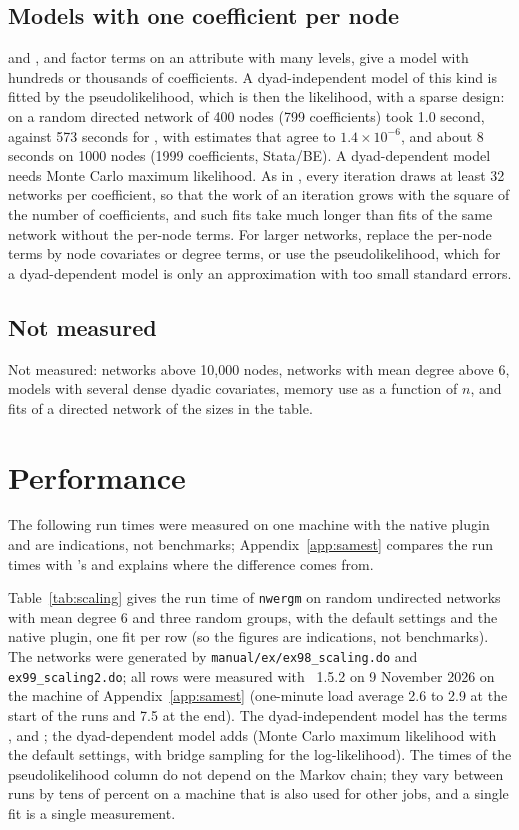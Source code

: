 \subsection{Models with one coefficient per node}\label{sec:pernode}

 and , and factor terms on an attribute with many levels, give a model with hundreds or thousands of coefficients. A dyad-independent model of this kind is fitted by the pseudolikelihood, which is then the likelihood, with a sparse design:  on a random directed network of 400 nodes (799 coefficients) took 1.0 second, against 573 seconds for \ergm{}, with estimates that agree to $1.4\times10^{-6}$, and about 8 seconds on 1000 nodes (1999 coefficients, Stata/BE). A dyad-dependent model needs Monte Carlo maximum likelihood. As in \ergm{}, every iteration draws at least 32 networks per coefficient, so that the work of an iteration grows with the square of the number of coefficients, and such fits take much longer than fits of the same network without the per-node terms. For larger networks, replace the per-node terms by node covariates or degree terms, or use the pseudolikelihood, which for a dyad-dependent model is only an approximation with too small standard errors.

\subsection{Not measured}

Not measured: networks above 10,000 nodes, networks with mean degree above 6, models with several dense dyadic covariates, memory use as a function of $n$, and fits of a directed network of the sizes in the table.

\section{Performance}\label{sec:runtimes}

The following run times were measured on one machine with the native plugin and are indications, not benchmarks; Appendix~\ref{app:samest} compares the run times with \ergm{}'s and explains where the difference comes from.

Table~\ref{tab:scaling} gives the run time of \texttt{nwergm} on random undirected networks with mean degree 6 and three random groups, with the default settings and the native plugin, one fit per row (so the figures are indications, not benchmarks). The networks were generated by \texttt{manual/ex/ex98\_scaling.do} and \texttt{ex99\_scaling2.do}; all rows were measured with \nwergm{}~1.5.2 on 9 November 2026 on the machine of Appendix~\ref{app:samest} (one-minute load average 2.6 to 2.9 at the start of the runs and 7.5 at the end). The dyad-independent model has the terms ,  and ; the dyad-dependent model adds  (Monte Carlo maximum likelihood with the default settings, with bridge sampling for the log-likelihood). The times of the pseudolikelihood column do not depend on the Markov chain; they vary between runs by tens of percent on a machine that is also used for other jobs, and a single fit is a single measurement.

